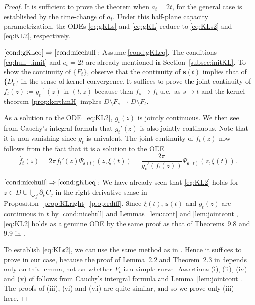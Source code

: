 \documentclass[preprint,12pt]{elsarticle}
\theoremstyle{definition}
\newcommand{\slit}{\mathbf{s}}
\begin{document}
\begin{proof}
It is sufficient to prove the theorem when $a_t=2t$,
for the general case is established by the time-change of $a_t$.
Under this half-plane capacity parametrization,
the ODEs \eqref{eq:gKLs} and \eqref{eq:gKL} reduce to
\eqref{eq:KLs2} and \eqref{eq:KL2}, respectively.

\noindent
$\eqref{cond:gKLeq} \Rightarrow \eqref{cond:nicehull}$:
Assume \eqref{cond:gKLeq}.
The conditions \eqref{eq:hull_limit} and $a_t=2t$ are already mentioned
in Section~\ref{subsec:initKL}.
To show the continuity of $\{F_t\}$,
observe that the continuity of $\slit(t)$ implies that of $\{D_t\}$
in the sense of kernel convergence.
It suffices to prove the joint continuity of $f_t(z):=g_t^{-1}(z)$ in $(t,z)$
because then $f_s \to f_t$ u.c.\ as $s \to t$ and
the kernel theorem~\ref{prop:kerthmH} implies
$D \setminus F_s \to D \setminus F_t$.

As a solution to the ODE~\eqref{eq:KL2}, $g_t(z)$ is jointly continuous.
We then see from Cauchy's integral formula that $g_t'(z)$ is also jointly continuous.
Note that it is non-vanishing since $g_t$ is univalent.
The joint continuity of $f_t(z)$ now follows from the fact that
it is a solution to the ODE
\[
\dot{f_t}(z)=2\pi f_t'(z)\Psi_{\slit(t)}(z, \xi(t))
	=\frac{2\pi}{g_t'(f_t(z))}\Psi_{\slit(t)}(z, \xi(t)).
\]

\noindent
$\eqref{cond:nicehull} \Rightarrow \eqref{cond:gKLeq}$:
We have already seen that \eqref{eq:KL2} holds
for $z \in D \cup \bigcup_j \partial_p C_j$
in the right derivative sense in Proposition~\ref{prop:KLright}~\eqref{prop:rdiff}.
Since $\xi(t)$, $\slit(t)$ and $g_t(z)$ are continuous in $t$
by \eqref{cond:nicehull} and Lemmas~\ref{lem:cont} and \ref{lem:jointcont},
\eqref{eq:KL2} holds as a genuine ODE
by the same proof as that of Theorems~9.8 and 9.9 in \cite{CFR16}.

To establish \eqref{eq:KLs2},
we can use the same method as in \cite[Section~2]{CF18}.
Hence it suffices to prove \cite[Lemma~2.1]{CF18} in our case,
because the proof of Lemma~2.2 and Theorem~2.3 in \cite{CF18}
depends only on this lemma, not on whether $F_t$ is a simple curve.
Assertions (i), (ii), (iv) and (v) of \cite[Lemma~2.1]{CF18} follows from
Cauchy's intergral formula and Lemma~\ref{lem:jointcont}.
The proofs of (iii), (vi) and (vii) are quite similar, and so we prove only (iii) here.


\end{proof}
\end{document}
